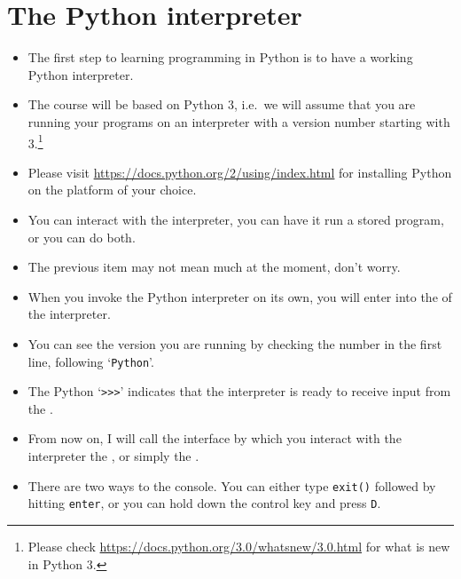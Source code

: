 \documentclass[a4paper]{article}
\begin{document}
\tableofcontents

\section{The Python interpreter}

\begin{itemize}
\item The first step to learning programming in Python is to have a working
Python interpreter.

\item The course will be based on Python 3, i.e.\ we will assume that you are
running your programs on an interpreter with a version number starting with
3.\footnote{Please check \url{https://docs.python.org/3.0/whatsnew/3.0.html}
for what is new in Python 3.}

\item Please visit \url{https://docs.python.org/2/using/index.html} for
installing Python on the platform of your choice.

\item You can interact with the interpreter, you can have it run a stored
program, or you can do both.

\item The previous item may not mean much at the moment, don't worry. 

\item When you invoke the Python interpreter on its own, you will enter into the
 of the interpreter.


\begin{ucodeframe}

\end{ucodeframe}

\item You can see the version you are running by checking the number in the
first line, following `\Verb+Python+'.
\item The Python  `\Verb+>>>+' indicates that the interpreter is ready
to receive input from the .   
\item From now on, I will call the interface by which you interact with the
interpreter the , or simply the .
\item There are two ways to  the console. You can either type
\Verb+exit()+ followed by hitting \Verb+enter+, or you can hold down the control key and
press \Verb+D+.


\end{itemize}
\end{document}
